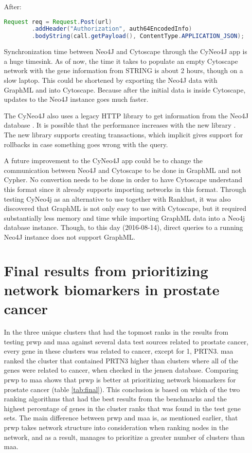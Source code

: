 After:
\begin{lstlisting}[frame=single,language=Java]
Request req = Request.Post(url)
        .addHeader("Authorization", auth64EncodedInfo)
        .bodyString(call.getPayload(), ContentType.APPLICATION_JSON);
\end{lstlisting}

Synchronization time between Neo4J and Cytoscape through the CyNeo4J app is a
huge timesink. As of now, the time it takes to populate an empty Cytoscape
network with the gene information from STRING is about 2 hours, though on a slow
laptop. This could be shortened by exporting the Neo4J data with GraphML and
into Cytoscape. Because after the initial data is inside Cytoscape, updates to
the Neo4J instance goes much faster.

The CyNeo4J also uses a legacy HTTP library to get information from the Neo4J
database \cite{legacy-neo4j}. It is possible that the performance increases with
the new library \cite{transactional-neo4j}. The new library supports creating
transactions, which implicit gives support for rollbacks in case something goes
wrong with the query.

A future improvement to the CyNeo4J app could be to change the communication
between Neo4J and Cytoscape to be done in GraphML and not Cypher. No convertion
needs to be done in order to have Cytoscape understand this format since it
already supports importing networks in this format. Through testing CyNeo4j as
an alternative to use together with Ranklust, it was also discovered that
GraphML is not only easy to use with Cytoscape, but it required substantially
less memory and time while importing GraphML data into a Neo4j database
instance. Though, to this day (2016-08-14), direct queries to a running Neo4J
instance does not support GraphML.

\section{Final results from prioritizing network biomarkers in prostate cancer}
In the three unique clusters that had the topmost ranks in the results from
testing \gls{prwp} and \gls{maa} against several data test sources related to
prostate cancer, every gene in these clusters was related to cancer, except for
1, PRTN3. \gls{maa} ranked the cluster that contained PRTN3 higher than clusters
where all of the genes were related to cancer, when checked in the \gls{jensen}
database. Comparing \gls{prwp} to \gls{maa} shows that \gls{prwp} is
better at prioritizing network biomarkers for prostate cancer
(table \ref{tab:final}). This conclusion is based on which of the two ranking
algorithms that had the best results from the benchmarks and the highest
percentage of genes in the cluster ranks that was found in the test gene sets.
The main difference between \gls{prwp} and \gls{maa} is, as mentioned earlier,
that \gls{prwp} takes network structure into consideration when ranking nodes in
the network, and as a result, manages to prioritize a greater number of clusters
than \gls{maa}.
